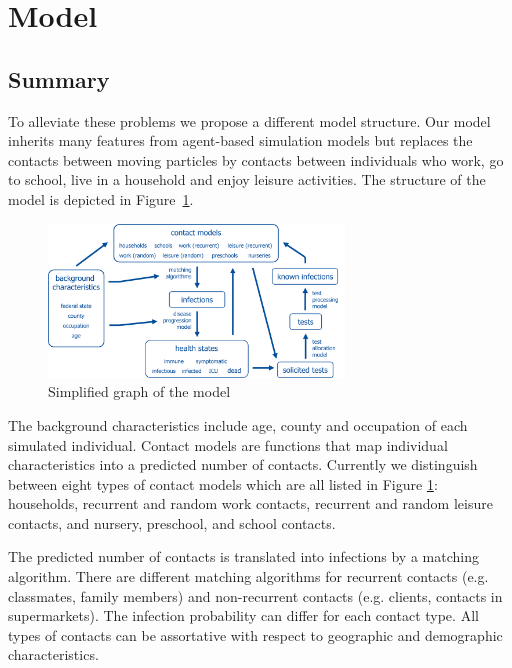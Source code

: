 \section{Model}
\label{sec:model}

\subsection{Summary}

To alleviate these problems we propose a different model structure. Our model inherits many features from agent-based simulation models but replaces the contacts between moving particles by contacts between individuals who work, go to school, live in a household and enjoy leisure activities. The structure of the model is depicted in Figure~\ref{fig:model_graph}.

\begin{figure}[!ht]
    \centering
    \includegraphics[width=0.7\textwidth]{../figures/model_detailed.png}
    \caption{Simplified graph of the model}
    \label{fig:model_graph}
\end{figure}

The background characteristics include age, county and occupation of each simulated individual. Contact models are functions that map individual characteristics into a predicted number of contacts. Currently we distinguish between eight types of contact models which are all listed in Figure \ref{fig:model_graph}: households, recurrent and random work contacts, recurrent and random leisure contacts, and nursery, preschool, and school contacts.

The predicted number of contacts is translated into infections by a matching algorithm. There are different matching algorithms for recurrent contacts (e.g. classmates, family members) and non-recurrent contacts (e.g. clients, contacts in supermarkets). The infection probability can differ for each contact type. All types of contacts can be assortative with respect to geographic and demographic characteristics.

